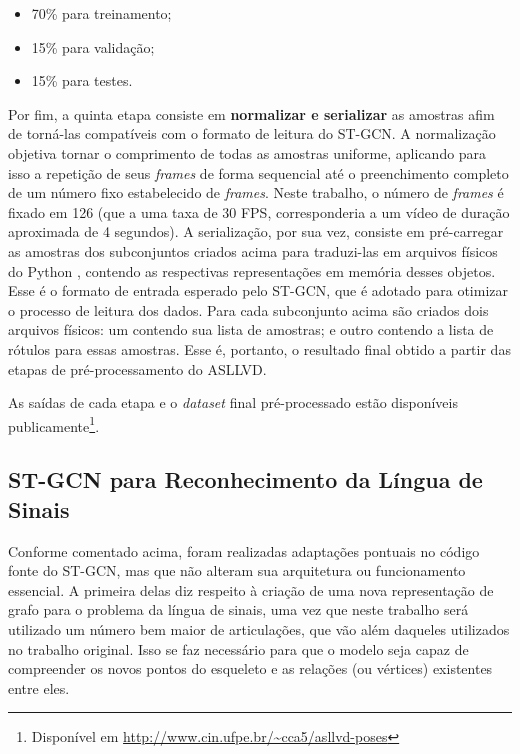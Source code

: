 \begin{itemize}
    \item 70\% para treinamento;
    \item 15\% para validação;
    \item 15\% para testes.
\end{itemize}

Por fim, a quinta etapa consiste em \textbf{normalizar e serializar} as amostras afim de torná-las compatíveis com o formato de leitura do ST-GCN. A normalização objetiva tornar o comprimento de todas as amostras uniforme, aplicando para isso a repetição de seus \textit{frames} de forma sequencial até o preenchimento completo de um número fixo estabelecido de \textit{frames}. Neste trabalho, o número de \textit{frames} é fixado em 126 (que a uma taxa de 30 FPS, corresponderia a um vídeo de duração aproximada de 4 segundos). A serialização, por sua vez, consiste em pré-carregar as amostras dos subconjuntos criados acima para traduzi-las em arquivos físicos do Python \cite{python}, contendo as respectivas representações em memória desses objetos. Esse é o formato de entrada esperado pelo ST-GCN, que é adotado para otimizar o processo de leitura dos dados. Para cada subconjunto acima são criados dois arquivos físicos: um contendo sua lista de amostras; e outro contendo a lista de rótulos para essas amostras. Esse é, portanto, o resultado final obtido a partir das etapas de pré-processamento do ASLLVD.

As saídas de cada etapa e o \textit{dataset} final pré-processado estão disponíveis publicamente\footnote{
    Disponível em \url{http://www.cin.ufpe.br/~cca5/asllvd-poses}
}.


\subsection{ST-GCN para Reconhecimento da Língua de Sinais} %

Conforme comentado acima, foram realizadas adaptações pontuais no código fonte do ST-GCN, mas que não alteram sua arquitetura ou funcionamento essencial. A primeira delas diz respeito à criação de uma nova representação de grafo para o problema da língua de sinais, uma vez que neste trabalho será utilizado um número bem maior de articulações, que vão além daqueles utilizados no trabalho original. Isso se faz necessário para que o modelo seja capaz de compreender os novos pontos do esqueleto e as relações (ou vértices) existentes entre eles. 

